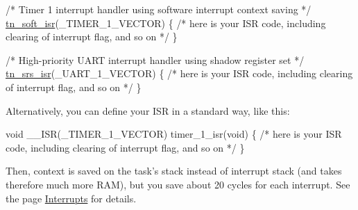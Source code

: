 \begin{DoxyCode}
\textcolor{comment}{/* Timer 1 interrupt handler using software interrupt context saving */}
\hyperlink{tn__arch__pic32_8h_a46a860d030e59e2c6aa827ca5ad36a37}{tn\_soft\_isr}(\_TIMER\_1\_VECTOR)
\{
   \textcolor{comment}{/* here is your ISR code, including clearing of interrupt flag, and so on */}
\}

\textcolor{comment}{/* High-priority UART interrupt handler using shadow register set */}
\hyperlink{tn__arch__pic32_8h_acb97f377bb993c30f6c83c582978d895}{tn\_srs\_isr}(\_UART\_1\_VECTOR)
\{
   \textcolor{comment}{/* here is your ISR code, including clearing of interrupt flag, and so on */}
\}
\end{DoxyCode}


Alternatively, you can define your I\+S\+R in a standard way, like this\+:


\begin{DoxyCode}
\textcolor{keywordtype}{void} \_\_ISR(\_TIMER\_1\_VECTOR) timer\_1\_isr(\textcolor{keywordtype}{void})
\{
   \textcolor{comment}{/* here is your ISR code, including clearing of interrupt flag, and so on */}
\}
\end{DoxyCode}


Then, context is saved on the task's stack instead of interrupt stack (and takes therefore much more R\+A\+M), but you save about 20 cycles for each interrupt. See the page \hyperlink{interrupts}{Interrupts} for details. 